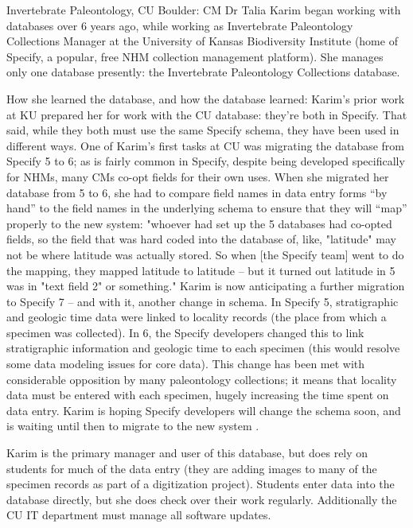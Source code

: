 Invertebrate Paleontology, CU Boulder: CM Dr Talia Karim began working with databases over 6 years ago, while working as Invertebrate Paleontology Collections Manager at the University of Kansas Biodiversity Institute (home of Specify, a popular, free NHM collection management platform). She manages only one database presently: the Invertebrate Paleontology Collections database.

How she learned the database, and how the database learned: Karim’s prior work at KU prepared her for work with the CU database: they’re both in Specify.  That said, while they both must use the same Specify schema, they have been used in different ways.  One of Karim’s first tasks at CU was migrating the database from Specify 5 to 6; as is fairly common in Specify, despite being developed specifically for NHMs, many CMs co-opt fields for their own uses. When she migrated her database from 5 to 6, she had to compare field names in data entry forms “by hand” to the field names in the underlying schema to ensure that they will “map” properly to the new system: 
"whoever had set up the 5 databases had co-opted fields, so the field that was hard coded into the database of, like, "latitude" may not be where latitude was actually stored.  So when [the Specify team] went to do the mapping, they mapped latitude to latitude -- but it turned out latitude in 5 was in "text field 2" or something." 
Karim is now anticipating a further migration to Specify 7 – and with it, another change in schema. In Specify 5, stratigraphic and geologic time data were linked to locality records (the place from which a specimen was collected).  In 6, the Specify developers changed this to link stratigraphic information and geologic time to each specimen (this would resolve some data modeling issues for core data).  This change has been met with considerable opposition by many paleontology collections; it means that locality data must be entered with each specimen, hugely increasing the time spent on data entry. Karim is hoping Specify developers will change the schema soon, and is waiting until then to migrate to the new system .  

Karim is the primary manager and user of this database, but does rely on students for much of the data entry (they are adding images to many of the specimen records as part of a digitization project).  Students enter data into the database directly, but she does check over their work regularly. Additionally the CU IT department must manage all software updates.

